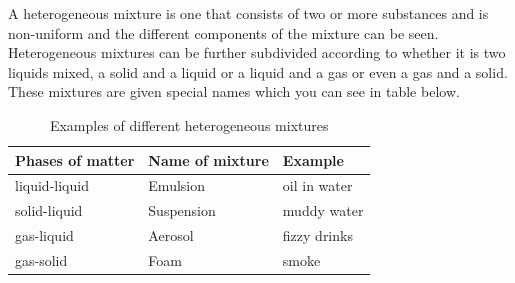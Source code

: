\label{m38708*fhsst!!!underscore!!!id89}\Definition{\label{id2405839} { Heterogeneous mixture }} 
{ \label{m38708*meaningfhsst!!!underscore!!!id89}
        A heterogeneous mixture is one that consists of two or more substances and is non-uniform and the different components of the mixture can be seen.
         } 
Heterogeneous mixtures can be further subdivided according to whether it is two liquids mixed, a solid and a liquid or a liquid and a gas or even a gas and a solid. These mixtures are given special names which you can see in table below. \par
\begin{table}[h!]
 \begin{center}
  \begin{tabular}{|l|l|l|}\hline
   \textbf{Phases of matter} & \textbf{Name of mixture} & \textbf{Example} \\ \hline
   liquid-liquid & Emulsion & oil in water \\ \hline
   solid-liquid & Suspension & muddy water \\ \hline
   gas-liquid & Aerosol & fizzy drinks \\ \hline
   gas-solid & Foam & smoke \\ \hline
  \end{tabular}

 \end{center}
\caption{Examples of different heterogeneous mixtures}
\label{tab:mixtures}
\end{table}
\\
      \label{m38708*uid6}
